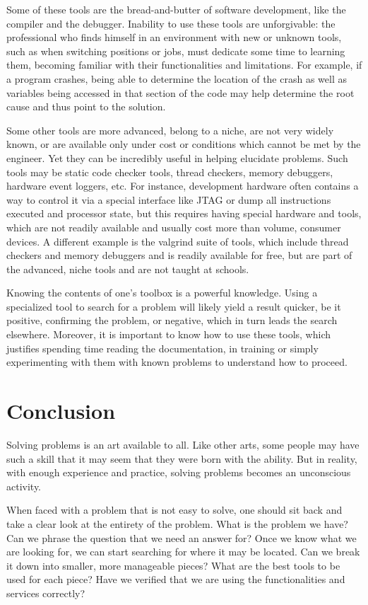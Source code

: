 Some of these tools are the bread-and-butter of software development, like the
compiler and the debugger. Inability to use these tools are unforgivable: the
professional who finds himself in an environment with new or unknown tools, such
as when switching positions or jobs, must dedicate some time to learning them,
becoming familiar with their functionalities and limitations. For example, if a
program crashes, being able to determine the location of the crash as well as
variables being accessed in that section of the code may help determine the root
cause and thus point to the solution.

Some other tools are more advanced, belong to a niche, are not very widely
known, or are available only under cost or conditions which cannot be met by the
engineer. Yet they can be incredibly useful in helping elucidate problems. Such
tools may be static code checker tools, thread checkers, memory debuggers,
hardware event loggers, etc. For instance, development hardware often contains a
way to control it via a special interface like JTAG or dump all instructions
executed and processor state, but this requires having special hardware and
tools, which are not readily available and usually cost more than volume,
consumer devices. A different example is the valgrind suite of tools, which
include thread checkers and memory debuggers and is readily available for free,
but are part of the advanced, niche tools and are not taught at schools.

Knowing the contents of one’s toolbox is a powerful knowledge. Using a
specialized tool to search for a problem will likely yield a result quicker, be
it positive, confirming the problem, or negative, which in turn leads the search
elsewhere. Moreover, it is important to know how to use these tools, which
justifies spending time reading the documentation, in training or simply
experimenting with them with known problems to understand how to proceed.

\section*{Conclusion}

Solving problems is an art available to all. Like other arts, some people may
have such a skill that it may seem that they were born with the ability. But in
reality, with enough experience and practice, solving problems becomes an
unconscious activity.

When faced with a problem that is not easy to solve, one should sit back and
take a clear look at the entirety of the problem. What is the problem we have?
Can we phrase the question that we need an answer for? Once we know what we are
looking for, we can start searching for where it may be located. Can we break it
down into smaller, more manageable pieces? What are the best tools to be used
for each piece? Have we verified that we are using the functionalities and
services correctly?

